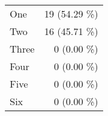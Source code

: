 \begin{tabular}{ l  r }
One & 19 (54.29 \%)\\
Two & 16 (45.71 \%)\\
Three & 0 (0.00 \%)\\
Four & 0 (0.00 \%)\\
Five & 0 (0.00 \%)\\
Six & 0 (0.00 \%)\\
\end{tabular}